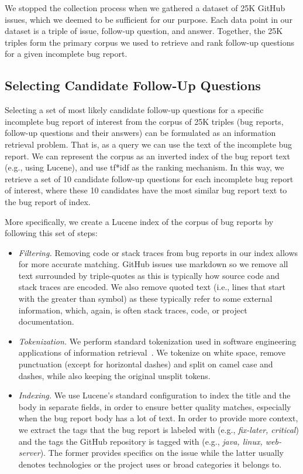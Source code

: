  We stopped the collection process when we gathered a dataset of 25K GitHub issues, which we deemed to be sufficient for our purpose. Each data point in our dataset is a triple of
issue, follow-up question, and answer. Together, the 25K triples form the primary corpus we used to
retrieve and rank follow-up questions for a given incomplete bug report.


\subsection{Selecting Candidate Follow-Up Questions}

Selecting a set of most likely candidate follow-up questions for a specific incomplete bug report of interest from the corpus
of 25K triples (bug reports, follow-up questions and their answers) can be formulated as an information retrieval
problem. That is, as a query we can use the text of the incomplete bug report. We can represent the corpus
as an inverted index of the bug report text (e.g., using Lucene), and use tf*idf as the
ranking mechanism. In this way, we retrieve a set of 10 candidate follow-up questions for each incomplete bug report
of interest, where these 10 candidates have the most similar bug report text to the bug report of index.

More specifically, we create a Lucene index of the corpus of bug reports by following this set of steps:
\begin{itemize}
\item {\em Filtering.} Removing code or stack traces from bug reports in our index allows
for more accurate matching. GitHub issues use markdown so we remove all text surrounded
by triple-quotes as this is typically how source code and stack traces are encoded. We also
remove quoted text (i.e., lines that start with the greater than symbol) as these typically
refer to some external information, which, again, is often stack traces, code, or project documentation.
\item {\em Tokenization.} We perform standard tokenization used in software engineering applications
of information retrieval~\cite{marcus2004information,shepherd2012sando}. We tokenize on white space, remove
punctuation (except for horizontal dashes)
and split on camel case and dashes, while also keeping the original unsplit tokens.
\item {\em Indexing.} We use Lucene's standard configuration to index the title and the body in separate fields,
in order to ensure better quality matches, especially when the bug report body has a lot of text. In order to provide
more context, we extract the tags that the bug report is labeled with (e.g., {\em fix-later, critical}) and the tags the
GitHub repository is tagged with (e.g., {\em java, linux, web-server}). The former provides specifics on the issue while the
latter usually denotes technologies or the project uses or broad categories it belongs to.
\end{itemize}

